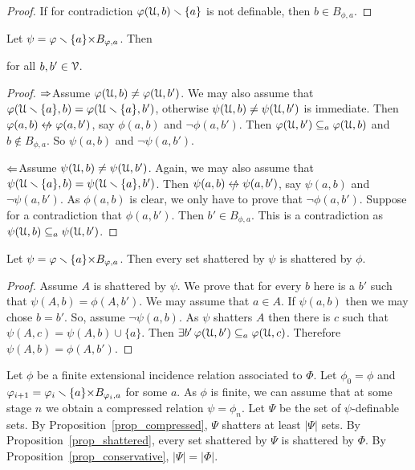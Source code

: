 \documentclass[sputnik.tex]{subfiles}
\begin{document}
\begin{proof}
If for contradiction $\varphi(\EuScript U,b)\smallsetminus\{a\}$ is not definable, then $b\in B_{\phi,a}$.
\end{proof}


\begin{proposition}\label{prop_conservative} Let $\psi=\varphi\smallsetminus\{a\}{\times}B_{\varphi,a}$.
Then

\hfill for all $b,b'\in\EuScript V$.
\end{proposition}

\begin{proof}
$\Rightarrow$\quad Assume $\varphi(\EuScript U,b)\neq\varphi(\EuScript U,b')$.
We may also assume that $\varphi(\EuScript U\smallsetminus\{a\},b)=\varphi(\EuScript U\smallsetminus\{a\},b')$, otherwise $\psi(\EuScript U,b)\neq\psi(\EuScript U,b')$ is immediate.
Then $\phi(a,b)\niff\phi(a,b')$, say $ \phi(a,b)$ and $\neg \phi(a,b')$.
Then $\varphi(\EuScript U,b')\subseteq_a\varphi(\EuScript U,b)$ and $b\notin B_{\phi,a}$.
So $\psi(a,b)$ and $\neg \psi(a,b')$.

$\Leftarrow$\quad Assume $\psi(\EuScript U,b)\neq\psi(\EuScript U,b')$. 
Again, we may also assume that $\psi(\EuScript U\smallsetminus\{a\},b)=\psi(\EuScript U\smallsetminus\{a\},b')$.
Then $\psi(a,b)\niff\psi(a,b')$, say $\psi(a,b)$ and $\neg\psi(a,b')$.
As $\phi(a,b)$ is clear, we only have to prove that $\neg\phi(a,b')$.
Suppose for a contradiction that $\phi(a,b')$.
Then $b'\in B_{\phi,a}$.
This is a contradiction as $\psi(\EuScript U,b)\subseteq_a\psi(\EuScript U,b')$.
\end{proof}


\begin{proposition}\label{prop_shattered} 
Let $\psi=\varphi\smallsetminus\{a\}{\times}B_{\varphi,a}$.
Then every set shattered by $\psi$ is shattered by $\phi$.
\end{proposition}

\begin{proof}
Assume $A$ is shattered by $\psi$.
We prove that for every $b$ here is a $b'$ such that $\psi(A,b)=\phi(A,b')$.
We may assume that $a\in A$.
If $\psi(a,b)$ then we may chose $b=b'$.
So, assume $\neg\psi(a,b)$.
As $\psi$ shatters $A$ then there is $c$ such that $\psi(A,c)=\psi(A,b)\cup\{a\}$.
Then $\exists b'\,\varphi(\EuScript U,b')\subseteq_a\varphi(\EuScript U,c)$.
Therefore $\psi(A,b)=\phi(A,b')$.
\end{proof}


\begin{void_thm}\label{proof2_Pajor}\rm
Let $\phi$ be a finite extensional incidence relation associated to $\Phi$.
Let $\phi_0=\phi$ and $\varphi_{i+1}=\varphi_i\smallsetminus \{a\}{\times}B_{\varphi_i,a}$ for some $a$.
As $\phi$ is finite, we can assume that at some stage $n$ we obtain a compressed relation $\psi=\phi_n$.
Let $\Psi$ be the set of $\psi$-definable sets.
By Proposition~\ref{prop_compressed}, $\Psi$ shatters at least $|\Psi|$ sets.
By Proposition~\ref{prop_shattered}, every set shattered by $\Psi$ is shattered by $\Phi$.
By Proposition~\ref{prop_conservative}, $|\Psi|=|\Phi|$.\QED
\end{void_thm}
\end{document}
